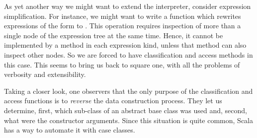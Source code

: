 \documentclass[a4paper,12pt,twoside,titlepage]{book}
\begin{document}
As yet another way we might want to extend the interpreter, consider
expression simplification. For instance, we might want to write a
function which rewrites expressions of the form
 to . This operation requires inspection of 
more than a single node of the expression tree at the same
time. Hence, it cannot be implemented by a method in each expression
kind, unless that method can also inspect other nodes. So we are
forced to have classification and access methods in this case. This
seems to bring us back to square one, with all the problems of
verbosity and extensibility.

Taking a closer look, one observers that the only purpose of the
classification and access functions is to {\em reverse} the data
construction process.  They let us determine, first, which sub-class
of an abstract base class was used and, second, what were the
constructor arguments. Since this situation is quite common, Scala has
a way to automate it with case classes. 
\end{document}
